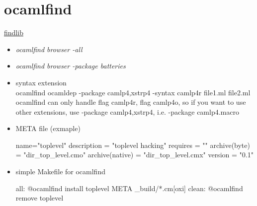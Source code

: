 \section{ocamlfind}

\href{http://projects.camlcity.org/projects/dl/findlib-1.2.3/doc/ref-html/r17.html}{findlib}


\begin{itemize}
\item \emph{ocamlfind browser -all }

\item \emph{ocamlfind browser -package batteries}

\item syntax extension \\
ocamlfind ocamldep -package camlp4,xstrp4 -syntax camlp4r file1.ml file2.ml \\
ocamlfind can only handle flag camlp4r, flag camlp4o, so if you want to
use other extensions,  use -package camlp4,xstrp4, i.e. -package camlp4.macro
  
\item META file (exmaple)


\begin{bluetext}
name="toplevel"
description = "toplevel hacking"
requires = ""
archive(byte) = "dir_top_level.cmo"
archive(native) = "dir_top_level.cmx"
version = "0.1"
\end{bluetext}


\item simple Makefile for ocamlfind 


\begin{bluetext}
all:
	   @ocamlfind install toplevel META _build/*.cm[oxi]
clean: 
	   @ocamlfind remove toplevel 
\end{bluetext}


         
\end{itemize}

  

